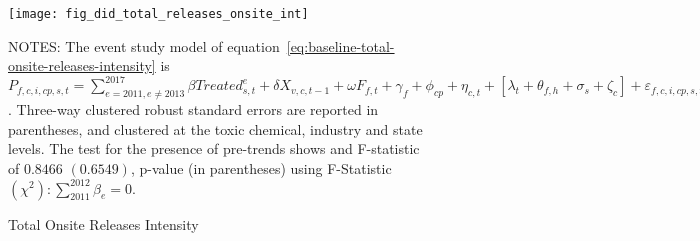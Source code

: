 \begin{figure}[H]
    \centering
    \texttt{[image: fig\_did\_total\_releases\_onsite\_int]}
    \caption{Total Onsite Releases Intensity}
    \label{fig:baseline-total-onsite-releases-intensity}
    \begin{minipage}{12cm}
        \vspace{0.05in}
        NOTES: The event study model of equation~\ref{eq:baseline-total-onsite-releases-intensity} is $P_{f,c,i,cp,s,t} = \sum_{{e = 2011},{e \neq 2013}}^{2017} \beta Treated_{s,t}^e + \delta X_{v,c,t-1} + \omega F_{f,t} + \gamma_{f} + \phi_{cp} + \eta_{c,t} + \left[\lambda_{t} + \theta_{f,h} + \sigma_{s} + \zeta_{c} \right] + \varepsilon_{f,c,i,cp,s,t}$. Three-way clustered robust standard errors are reported in parentheses, and clustered at the toxic chemical, industry and state levels. The test for the presence of pre-trends shows and F-statistic of $0.8466$ $(0.6549)$, p-value (in parentheses) using F-Statistic $(\chi^2): \sum_{2011}^{2012} \beta_{e} = 0$.
    \end{minipage}
\end{figure}